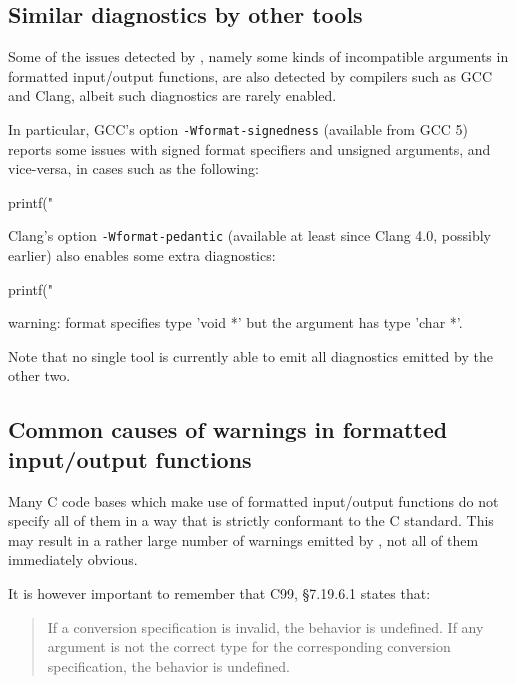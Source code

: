 \subsection{Similar diagnostics by other tools}

Some of the issues detected by , namely some kinds of
incompatible arguments in formatted input/output functions, are also detected
by compilers such as GCC and Clang, albeit such diagnostics are rarely enabled.

In particular, GCC's option \verb+-Wformat-signedness+ (available from GCC 5)
reports some issues with signed format specifiers and unsigned arguments, and
vice-versa, in cases such as the following:

\begin{ccode}
  printf("%
\end{ccode}

Clang's option \verb+-Wformat-pedantic+ (available at least since Clang 4.0,
possibly earlier) also enables some extra diagnostics:

\begin{ccode}
  printf("%
\end{ccode}

\begin{logs}
  warning: format specifies type 'void *' but the argument has type 'char *'.
\end{logs}

Note that no single tool is currently able to emit all diagnostics emitted
by the other two.

\subsection{Common causes of warnings in formatted input/output functions}

Many C code bases which make use of formatted input/output functions do not
specify all of them in a way that is strictly conformant to the C standard.
This may result in a rather large number of warnings emitted by
, not all of them immediately obvious.

It is however important to remember that C99, §7.19.6.1 states that:

\begin{quote}
  If a conversion specification is invalid, the behavior is undefined.
  If any argument is not the correct type for the corresponding conversion
  specification, the behavior is undefined.
\end{quote}

